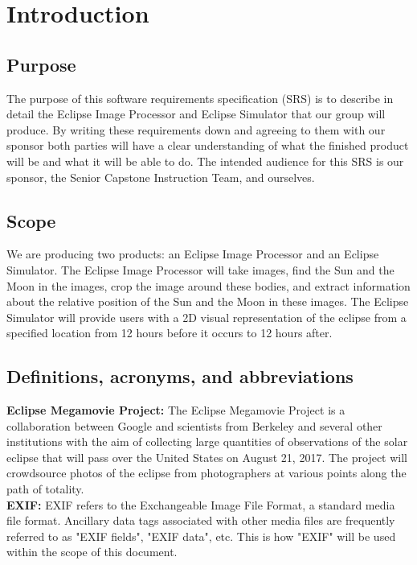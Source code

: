 \documentclass[10pt, onecolumn, draftclsnofoot, letterpaper, compsoc]{IEEEtran}
\begin{document}
\section{Introduction}

\subsection{Purpose}
The purpose of this software requirements specification (SRS) is to describe in
detail the Eclipse Image Processor and Eclipse Simulator that our group will 
produce. By writing these requirements down and agreeing to them with our 
sponsor both parties will have a clear understanding of what the finished 
product will be and what it will be able to do. The intended audience for this 
SRS is our sponsor, the Senior Capstone Instruction Team, and ourselves.

\subsection{Scope}
We are producing two products: an Eclipse Image Processor and an Eclipse 
Simulator. The Eclipse Image Processor will take images, find the Sun and the
Moon in the images, crop the image around these bodies, and extract information 
about the relative position of the Sun and the Moon in these images. The Eclipse 
Simulator will provide users with a 2D visual representation of the eclipse from a 
specified location from 12 hours before it occurs to 12 hours after.

\subsection{Definitions, acronyms, and abbreviations}
	
	\textbf{Eclipse Megamovie Project:}
	The Eclipse Megamovie Project is a collaboration between Google 
	and scientists from Berkeley and several other institutions with the 
	aim of collecting large quantities of observations of the solar eclipse
	that will pass over the United States on August 21, 2017. The project
	will crowdsource photos of the eclipse from photographers at various 
	points along the path of totality. \\

	\noindent \textbf{EXIF:}
	EXIF refers to the Exchangeable Image File Format, a standard 
	media file format. Ancillary data tags associated with other media 
	files are frequently referred to as "EXIF fields", "EXIF data", etc.
	This is how "EXIF" will be used within the scope of this document. \\
\end{document}
